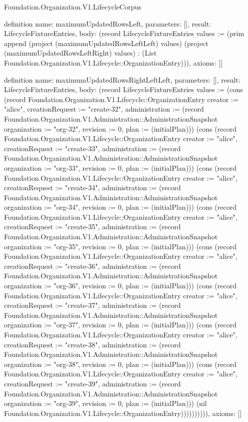 \begin{lexlean}{Foundation.Organization.V1.LifecycleCorpus}
\begin{semanticmodule}
definition{
  name: maximumUpdatedRowsLeft,
  parameters: [],
  result: LifecycleFixtureEntries,
  body: (record LifecycleFixtureEntries {values := (prim append (project (maximumUpdatedRowsLeftLeft) values) (project (maximumUpdatedRowsLeftRight) values) : (List Foundation.Organization.V1.Lifecycle::OrganizationEntry))}),
  axioms: []
}

definition{
  name: maximumUpdatedRowsRightLeftLeft,
  parameters: [],
  result: LifecycleFixtureEntries,
  body: (record LifecycleFixtureEntries {values := (cons (record Foundation.Organization.V1.Lifecycle::OrganizationEntry {creator := "alice", creationRequest := "create-32", administration := (record Foundation.Organization.V1.Administration::AdministrationSnapshot {organization := "org-32", revision := 0, plan := (initialPlan)})}) (cons (record Foundation.Organization.V1.Lifecycle::OrganizationEntry {creator := "alice", creationRequest := "create-33", administration := (record Foundation.Organization.V1.Administration::AdministrationSnapshot {organization := "org-33", revision := 0, plan := (initialPlan)})}) (cons (record Foundation.Organization.V1.Lifecycle::OrganizationEntry {creator := "alice", creationRequest := "create-34", administration := (record Foundation.Organization.V1.Administration::AdministrationSnapshot {organization := "org-34", revision := 0, plan := (initialPlan)})}) (cons (record Foundation.Organization.V1.Lifecycle::OrganizationEntry {creator := "alice", creationRequest := "create-35", administration := (record Foundation.Organization.V1.Administration::AdministrationSnapshot {organization := "org-35", revision := 0, plan := (initialPlan)})}) (cons (record Foundation.Organization.V1.Lifecycle::OrganizationEntry {creator := "alice", creationRequest := "create-36", administration := (record Foundation.Organization.V1.Administration::AdministrationSnapshot {organization := "org-36", revision := 0, plan := (initialPlan)})}) (cons (record Foundation.Organization.V1.Lifecycle::OrganizationEntry {creator := "alice", creationRequest := "create-37", administration := (record Foundation.Organization.V1.Administration::AdministrationSnapshot {organization := "org-37", revision := 0, plan := (initialPlan)})}) (cons (record Foundation.Organization.V1.Lifecycle::OrganizationEntry {creator := "alice", creationRequest := "create-38", administration := (record Foundation.Organization.V1.Administration::AdministrationSnapshot {organization := "org-38", revision := 0, plan := (initialPlan)})}) (cons (record Foundation.Organization.V1.Lifecycle::OrganizationEntry {creator := "alice", creationRequest := "create-39", administration := (record Foundation.Organization.V1.Administration::AdministrationSnapshot {organization := "org-39", revision := 0, plan := (initialPlan)})}) (nil Foundation.Organization.V1.Lifecycle::OrganizationEntry)))))))))}),
  axioms: []
}


\end{semanticmodule}
\end{lexlean}
